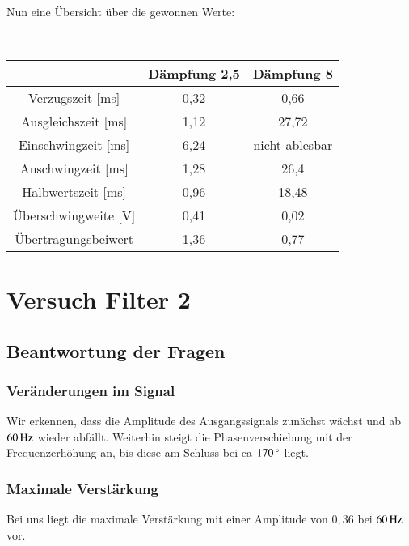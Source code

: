 \hfill \\

Nun eine Übersicht über die gewonnen Werte:

\hfill \\

\begin{tabular}{c|c|c}
 & Dämpfung 2,5 & Dämpfung 8 \\ 
\hline 
Verzugszeit [ms] & 0,32 & 0,66 \\ 
\hline 
Ausgleichszeit [ms] & 1,12 & 27,72 \\ 
\hline 
Einschwingzeit [ms] & 6,24 & nicht ablesbar \\ 
\hline 
Anschwingzeit [ms] & 1,28 & 26,4 \\ 
\hline 
Halbwertszeit [ms] & 0,96 & 18,48 \\ 
\hline 
Überschwingweite [V] & 0,41 & 0,02 \\ 
\hline 
Übertragungsbeiwert & 1,36 & 0,77 \\ 
\end{tabular} 


\newpage



\section{Versuch Filter 2}


\subsection{Beantwortung der Fragen}


\subsubsection*{Veränderungen im Signal}

Wir erkennen, dass die Amplitude des Ausgangssignals zunächst wächst und ab $\unit[60]{Hz}$ wieder abfällt. Weiterhin steigt die Phasenverschiebung mit der Frequenzerhöhung an, bis diese am Schluss bei ca $\unit[170]{^\circ}$ liegt.


\subsubsection*{Maximale Verstärkung}

Bei uns liegt die maximale Verstärkung mit einer Amplitude von $0,36$ bei $\unit[60]{Hz}$ vor.



